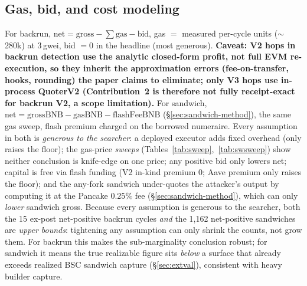 \documentclass[11pt]{article}
\begin{document}
\subsection{Gas, bid, and cost modeling}
For backrun, $\text{net}=\text{gross}-\sum\text{gas}-\text{bid}$, gas $=$ measured
per-cycle units ($\sim$280k) at 3\,gwei, bid $=0$ in the headline (most generous).
\textbf{Caveat: V2 hops in backrun detection use the analytic closed-form profit, not
full EVM re-execution, so they inherit the approximation errors (fee-on-transfer, hooks,
rounding) the paper claims to eliminate; only V3 hops use in-process QuoterV2
(Contribution~2 is therefore not fully receipt-exact for backrun V2, a scope
limitation).} For
sandwich, $\text{net}=\text{grossBNB}-\text{gasBNB}-\text{flashFeeBNB}$
(\S\ref{sec:sandwich-method}), the same gas sweep, flash premium charged on the
borrowed numeraire. Every assumption in both is \emph{generous to the searcher}: a
deployed executor adds fixed overhead (only raises the floor); the gas-price
\emph{sweeps} (Tables~\ref{tab:sweep},~\ref{tab:swsweep}) show neither conclusion is
knife-edge on one price; any positive bid only lowers net; capital is free via flash
funding (V2 in-kind premium 0; Aave premium only raises the floor); and the any-fork
sandwich under-quotes the attacker's output by computing it at the Pancake $0.25\%$
fee (\S\ref{sec:sandwich-method}), which can only \emph{lower} sandwich gross. Because
every assumption is generous to the searcher, both the 15 ex-post net-positive backrun
cycles \emph{and} the 1{,}162 net-positive sandwiches are \emph{upper bounds}:
tightening any assumption can only shrink the counts, not grow them. For backrun this
makes the sub-marginality conclusion robust; for sandwich it means the true realizable
figure sits \emph{below} a surface that already exceeds realized BSC sandwich capture
(\S\ref{sec:extval}), consistent with heavy builder capture.
\end{document}
